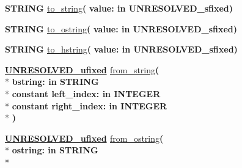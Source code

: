 \begin{DoxyCompactItemize}
\item 
{\bfseries {\bfseries \textcolor{comment}{S\+T\+R\+I\+N\+G}\textcolor{vhdlchar}{ }}} \hyperlink{classfixed__pkg_af56ceef013a6410cf13e94e989da4d33}{to\+\_\+string}{\bfseries  ( }{\bfseries \textcolor{vhdlchar}{value\+: }\textcolor{stringliteral}{in }\textcolor{vhdlchar}{U\+N\+R\+E\+S\+O\+L\+V\+E\+D\+\_\+sfixed}}{\bfseries  )} 
\item 
{\bfseries {\bfseries \textcolor{comment}{S\+T\+R\+I\+N\+G}\textcolor{vhdlchar}{ }}} \hyperlink{classfixed__pkg_aa4e5c418f084f52cb97589cd0ea72a57}{to\+\_\+ostring}{\bfseries  ( }{\bfseries \textcolor{vhdlchar}{value\+: }\textcolor{stringliteral}{in }\textcolor{vhdlchar}{U\+N\+R\+E\+S\+O\+L\+V\+E\+D\+\_\+sfixed}}{\bfseries  )} 
\item 
{\bfseries {\bfseries \textcolor{comment}{S\+T\+R\+I\+N\+G}\textcolor{vhdlchar}{ }}} \hyperlink{classfixed__pkg_a8edf96017c02c0534882acdd5058d739}{to\+\_\+hstring}{\bfseries  ( }{\bfseries \textcolor{vhdlchar}{value\+: }\textcolor{stringliteral}{in }\textcolor{vhdlchar}{U\+N\+R\+E\+S\+O\+L\+V\+E\+D\+\_\+sfixed}}{\bfseries  )} 
\item 
{\bfseries {\bfseries {\bfseries \hyperlink{classfixed__pkg_ae78bc2b36d22f6abeac163955e8a587d}{U\+N\+R\+E\+S\+O\+L\+V\+E\+D\+\_\+ufixed}} \textcolor{vhdlchar}{ }}} \hyperlink{classfixed__pkg_aeab263e2ba2f221f75e5c777fc4d4e31}{from\+\_\+string}{\bfseries  ( }\\*
{\bfseries \textcolor{vhdlchar}{bstring\+: }\textcolor{stringliteral}{in }{\bfseries \textcolor{comment}{S\+T\+R\+I\+N\+G}\textcolor{vhdlchar}{ }}}\\*
{\bfseries {\bfseries \textcolor{keywordflow}{constant}\textcolor{vhdlchar}{ }}\textcolor{vhdlchar}{left\+\_\+index\+: }\textcolor{stringliteral}{in }{\bfseries \textcolor{comment}{I\+N\+T\+E\+G\+E\+R}\textcolor{vhdlchar}{ }}}\\*
{\bfseries {\bfseries \textcolor{keywordflow}{constant}\textcolor{vhdlchar}{ }}\textcolor{vhdlchar}{right\+\_\+index\+: }\textcolor{stringliteral}{in }{\bfseries \textcolor{comment}{I\+N\+T\+E\+G\+E\+R}\textcolor{vhdlchar}{ }}}\\*
{\bfseries  )} 
\item 
{\bfseries {\bfseries {\bfseries \hyperlink{classfixed__pkg_ae78bc2b36d22f6abeac163955e8a587d}{U\+N\+R\+E\+S\+O\+L\+V\+E\+D\+\_\+ufixed}} \textcolor{vhdlchar}{ }}} \hyperlink{classfixed__pkg_ac21b381d5dc0c001dc930721aacd668f}{from\+\_\+ostring}{\bfseries  ( }\\*
{\bfseries \textcolor{vhdlchar}{ostring\+: }\textcolor{stringliteral}{in }{\bfseries \textcolor{comment}{S\+T\+R\+I\+N\+G}\textcolor{vhdlchar}{ }}}\\*

\end{DoxyCompactItemize}
